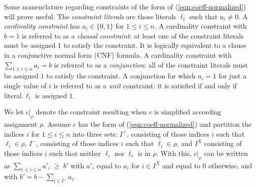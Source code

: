 \documentclass{easychair}
\renewcommand{\obar}[1]{\overline{#1}}
\newcommand{\lit}{\ell}
\newcommand{\assign}{\rho}
\newcommand{\simplify}[2]{#1|_{#2}}
\newcommand{\nassign}{\obar{\assign}}
\newcommand{\func}[1]{\llbracket#1\rrbracket}
\begin{document}
Some nomenclature regarding constraints of the form of
(\ref{eqn:coeff-normalized}) will prove useful.  The {\em constraint
  literals} are those literals $\lit_i$ such that $a_i \not = 0$.  A
{\em cardinality constraint} has $a_i \in \{0,1\}$ for $1 \leq i \leq
n$.  A cardinality constraint with $b=1$ is referred to as a {\em
  clausal constraint}: at least one of the constraint literals must be assigned 1
to satisfy the constraint.  It is logically equivalent to a clause in a conjunctive normal form (CNF) formula.
A cardinality constraint with $\sum_{1\leq
  i\leq n} a_i = b$ is referred to as a {\em conjunction}: all of the
constraint literals must be assigned $1$ to satisfy the constraint.
A
conjunction for which $a_i = 1$ for just a single value of $i$ is
referred to as a {\em unit} constraint: it is satisfied if and only if
literal $\lit_i$ is assigned $1$.




We let $\simplify{c}{\assign}$ denote the constraint resulting when $c$ is
simplified according assignment $\assign$.  Assume $c$ has the form of (\ref{eqn:coeff-normalized}) and
partition the indices $i$ for $1 \leq i \leq n$ into
three sets:
$I^{+}$, consisting of those indices $i$ such that $\lit_i \in \assign$,
$I^{-}$, consisting of those indices $i$ such that $\obar{\lit}_i \in \assign$,
and $I^{X}$ consisting of those indices $i$ such that neither $\lit_i$ nor $\obar{\lit}_i$ is in $\assign$.
With this, $\simplify{c}{\assign}$ can be written as $\sum_{1 \leq i \leq n} a'_i \; \geq \; b'$
with $a'_i$ equal to $a_i$ for $i \in I^{X}$ and equal to $0$ otherwise, and with $b' = b - \sum_{i\in I^{+}} a_i$.


\end{document}
